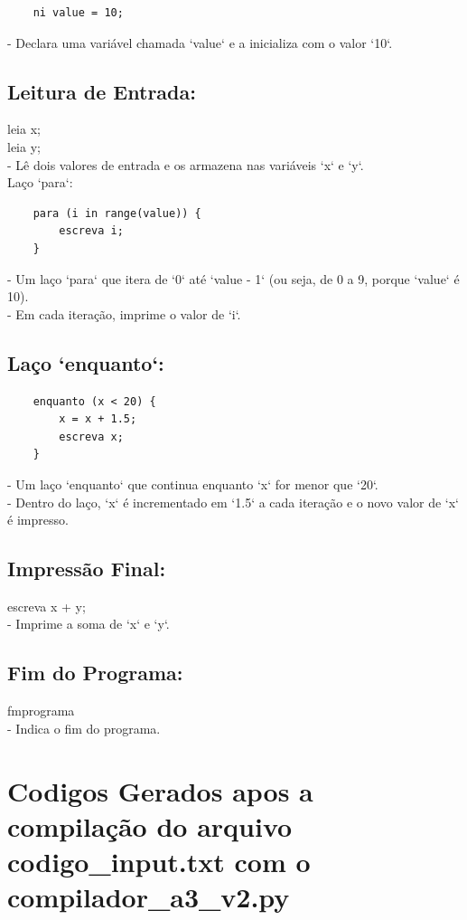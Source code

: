 \documentclass[a4paper,12pt]{article}
\begin{document}
\begin{verbatim}
    ni value = 10; 
\end{verbatim}

    - Declara uma variável chamada `value` e a inicializa com o valor 
    `10`.
\\    
\subsection{Leitura de Entrada:}

    leia x;
    \\
    leia y;
    \\
    - Lê dois valores de entrada e os armazena nas variáveis `x` e `y`.
\\
Laço `para`:
 \begin{verbatim}  
    para (i in range(value)) {
        escreva i;
    }
 \end{verbatim}   
    - Um laço `para` que itera de `0` até `value - 1` (ou seja, de 0 a 
    9, porque `value` é 10).
    \\
    - Em cada iteração, imprime o valor de `i`.
    
\subsection{Laço `enquanto`:}
  \begin{verbatim} 
    enquanto (x < 20) {
        x = x + 1.5;
        escreva x;
    }
 \end{verbatim}    
    - Um laço `enquanto` que continua enquanto `x` for menor que `20`.
    \\
    - Dentro do laço, `x` é incrementado em `1.5` a cada iteração e o 
    novo valor de `x` é impresso.
\\    
\subsection{Impressão Final:}
    
    escreva x + y;
    \\
    - Imprime a soma de `x` e `y`.
\subsection{Fim do Programa:}
    
    fmprograma
    \\
    - Indica o fim do programa.

\section{Codigos Gerados apos a compilação do arquivo codigo\_input.txt 
com o  compilador\_a3\_v2.py}
\end{document}

